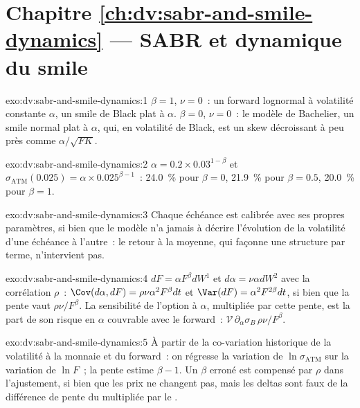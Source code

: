 \section*{Chapitre \ref{ch:dv:sabr-and-smile-dynamics} --- SABR et dynamique du smile}

\begin{solution}{exo:dv:sabr-and-smile-dynamics:1}
$\beta=1$, $\nu=0$~: un forward lognormal à volatilité constante $\alpha$, un smile de Black plat à $\alpha$. $\beta=0$,
$\nu=0$~: le modèle de Bachelier, un smile normal plat à $\alpha$, qui, en volatilité de Black, est un skew décroissant à peu près comme
$\alpha/\sqrt{FK}$.
\end{solution}

\begin{solution}{exo:dv:sabr-and-smile-dynamics:2}
$\alpha=0.2\times0.03^{1-\beta}$ et $\sigma_{\mathrm{ATM}}(0.025)=\alpha\times0.025^{\beta-1}$~: 24.0~\% pour $\beta=0$,
21.9~\% pour $\beta=0.5$, 20.0~\% pour $\beta=1$.
\end{solution}

\begin{solution}{exo:dv:sabr-and-smile-dynamics:3}
Chaque échéance est calibrée avec ses propres paramètres, si bien que le modèle n'a jamais à décrire l'évolution de la volatilité d'une échéance à l'autre~:
le retour à la moyenne, qui façonne une structure par terme, n'intervient pas.
\end{solution}

\begin{solution}{exo:dv:sabr-and-smile-dynamics:4}
$dF=\alpha F^\beta dW^1$ et $d\alpha=\nu\alpha dW^2$ avec la corrélation $\rho$~: $\Cov(d\alpha,dF)=\rho\nu\alpha^2F^\beta dt$
et $\Var(dF)=\alpha^2F^{2\beta}dt$, si bien que la pente vaut $\rho\nu/F^\beta$. La sensibilité de l'option à $\alpha$, multipliée par cette pente,
est la part de son risque en $\alpha$ couvrable avec le forward~: $\mathcal V\,\partial_\alpha\sigma_B\,\rho\nu/F^\beta$.
\end{solution}

\begin{solution}{exo:dv:sabr-and-smile-dynamics:5}
À partir de la co-variation historique de la volatilité à la monnaie et du forward~: on régresse la variation de $\ln\sigma_{\mathrm{ATM}}$
sur la variation de $\ln F$~; la pente estime $\beta-1$. Un $\beta$ erroné est compensé par $\rho$ dans l'ajustement, si bien que les
prix ne changent pas, mais les deltas sont faux de la différence de pente du  multipliée par le .
\end{solution}

